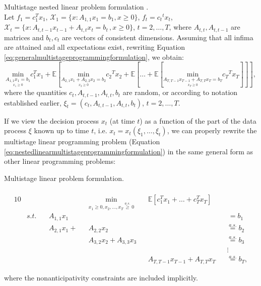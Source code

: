 \begin{defn}{Multistage nested linear problem formulation \cite[Ch. 1, p. 25]{stochasticprogrammingbible}}. \\
\label{defn:nestedlinearmultistageprogrammingformulation}
Let $f_1=c_1^Tx_1$, $\mathcal{X}_1=\{x:A_{1,1}x_1=b_1, x \geq 0 \}$, $f_t = {c_t}^tx_t$, $\mathcal{X}_t=\{x:A_{t,t-1}x_{t-1}+A_{t,t}x_t=b_t\, , x \geq 0\}$, $t=2,\dots,T$, where $A_{t,t}, A_{t,t-1}$ are matrices and $b_t, c_t$ are vectors of consistent dimensions.  Assuming that all infima are attained and all expectations exist, rewriting Equation \ref{eq:generalmultistageprogrammingformulation}, we obtain:
\footnotesize
\begin{equation}
\label{eq:nestedlinearmultistageprogrammingformulation}
\underset{\underset{x_1 \geq 0}{A_{1,1}x_1=b_1}}{\mathrm{min}}
 c_1^Tx_1 + \mathbb{E}\left[ \underset{\underset{x_{2} \geq 0}{A_{2,1}x_{1}+A_{2,2}x_2=b_2}}{\mathrm{min}} {c_2}^Tx_2 + \mathbb{E}\left[\dots + \mathbb{E}\left[ \underset{\underset{x_{T} \geq 0}{A_{T,T-1}x_{T-1}+A_{T,T}x_T=b_T}}{\mathrm{min}} {c_T}^Tx_T\right] \right] \right],
\end{equation}
\normalsize
where the quantities $c_t, A_{t,t-1}, A_{t,t}, b_{t}$ are random, or according to notation established earlier, $\xi_t=(c_t, A_{t,t-1}, A_{t,t}, b_{t})$, $t=2,\dots,T$. 
\end{defn}

If we view the decision process $x_t$ (at time $t$) as a function of the part of the data process $\xi$ known up to time $t$, i.e. $x_t=x_t(\xi_1,\dots,\xi_t)$, we can properly rewrite the multistage linear programming problem (Equation \ref{eq:nestedlinearmultistageprogrammingformulation}) in the same general form as other linear programming problems:
\begin{defn}
{Multistage linear problem formulation. \\ \cite[Ch. 1, p. 22]{stochasticprogrammingbible}} \\
\footnotesize
\begin{alignat}{10}
\label{eq:staircaselinearprogrammingformulation}
& &&  && \underset{x_1 \geq 0, x_2,\dots,x_T \overset{a.s.}{\geq} 0}{\mathrm{min}}  &&  \mathbb{E}\left[ c_1^Tx_1 + \dots +  c_T^Tx_T \right] && \\
& s.t. \, && A_{1,1}x_1 && && && \,=b_1 \nonumber \\
& && A_{2,1}x_1 +  && A_{2,2}x_2 && && \overset{a.s.}{=}b_2 \nonumber \\
& && && A_{3,2}x_2  +  A_{3,3}x_3 && && \overset{a.s.}{=}b_3 \nonumber \\
& && && && && \vdots \nonumber \\
& && && && A_{T,T-1}x_{T-1}  +  A_{T,T}x_T  && \overset{a.s.}{=}b_T, \nonumber
\end{alignat}
\normalsize
\end{defn}
where the nonanticipativity constraints are included implicitly.


